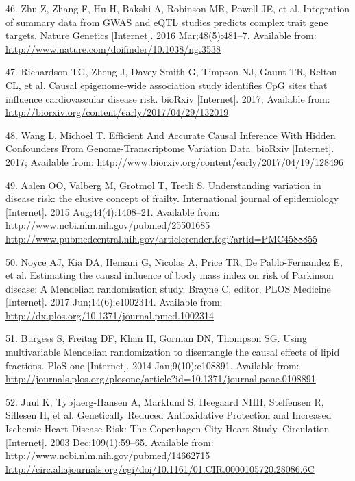 \documentclass[]{article}
\begin{document}
\hypertarget{ref-Zhu2016}{}
46. Zhu Z, Zhang F, Hu H, Bakshi A, Robinson MR, Powell JE, et al.
Integration of summary data from GWAS and eQTL studies predicts complex
trait gene targets. Nature Genetics {[}Internet{]}. 2016
Mar;48(5):481--7. Available from:
\url{http://www.nature.com/doifinder/10.1038/ng.3538}

\hypertarget{ref-Richardson2017}{}
47. Richardson TG, Zheng J, Davey Smith G, Timpson NJ, Gaunt TR, Relton
CL, et al. Causal epigenome-wide association study identifies CpG sites
that influence cardiovascular disease risk. bioRxiv {[}Internet{]}.
2017; Available from:
\url{http://biorxiv.org/content/early/2017/04/29/132019}

\hypertarget{ref-Wang2017}{}
48. Wang L, Michoel T. Efficient And Accurate Causal Inference With
Hidden Confounders From Genome-Transcriptome Variation Data. bioRxiv
{[}Internet{]}. 2017; Available from:
\url{http://www.biorxiv.org/content/early/2017/04/19/128496}

\hypertarget{ref-Aalen2015}{}
49. Aalen OO, Valberg M, Grotmol T, Tretli S. Understanding variation in
disease risk: the elusive concept of frailty. International journal of
epidemiology {[}Internet{]}. 2015 Aug;44(4):1408--21. Available from:
\href{http://www.ncbi.nlm.nih.gov/pubmed/25501685\%20http://www.pubmedcentral.nih.gov/articlerender.fcgi?artid=PMC4588855}{http://www.ncbi.nlm.nih.gov/pubmed/25501685 http://www.pubmedcentral.nih.gov/articlerender.fcgi?artid=PMC4588855}

\hypertarget{ref-Noyce2017}{}
50. Noyce AJ, Kia DA, Hemani G, Nicolas A, Price TR, De Pablo-Fernandez
E, et al. Estimating the causal influence of body mass index on risk of
Parkinson disease: A Mendelian randomisation study. Brayne C, editor.
PLOS Medicine {[}Internet{]}. 2017 Jun;14(6):e1002314. Available from:
\url{http://dx.plos.org/10.1371/journal.pmed.1002314}

\hypertarget{ref-Burgess2014a}{}
51. Burgess S, Freitag DF, Khan H, Gorman DN, Thompson SG. Using
multivariable Mendelian randomization to disentangle the causal effects
of lipid fractions. PloS one {[}Internet{]}. 2014 Jan;9(10):e108891.
Available from:
\url{http://journals.plos.org/plosone/article?id=10.1371/journal.pone.0108891}

\hypertarget{ref-Juul2003}{}
52. Juul K, Tybjaerg-Hansen A, Marklund S, Heegaard NHH, Steffensen R,
Sillesen H, et al. Genetically Reduced Antioxidative Protection and
Increased Ischemic Heart Disease Risk: The Copenhagen City Heart Study.
Circulation {[}Internet{]}. 2003 Dec;109(1):59--65. Available from:
\href{http://www.ncbi.nlm.nih.gov/pubmed/14662715\%20http://circ.ahajournals.org/cgi/doi/10.1161/01.CIR.0000105720.28086.6C}{http://www.ncbi.nlm.nih.gov/pubmed/14662715 http://circ.ahajournals.org/cgi/doi/10.1161/01.CIR.0000105720.28086.6C}
\end{document}
